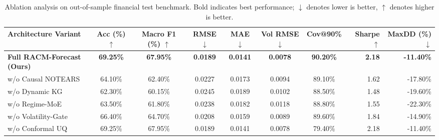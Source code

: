 \begin{table}[t]
\centering
\small
\caption{Ablation analysis on out-of-sample financial test benchmark. Bold indicates best performance; $\downarrow$ denotes lower is better, $\uparrow$ denotes higher is better.}
\label{tab:ablation_study}
\begin{tabular}{lccccccrr}
\toprule
\textbf{Architecture Variant} & \textbf{Acc} (\%) $\uparrow$ & \textbf{Macro F1} (\%) $\uparrow$ & \textbf{RMSE} $\downarrow$ & \textbf{MAE} $\downarrow$ & \textbf{Vol RMSE} $\downarrow$ & \textbf{Cov@90\%} & \textbf{Sharpe} $\uparrow$ & \textbf{MaxDD} (\%) $\downarrow$ \\
\midrule
\textbf{Full RACM-Forecast (Ours)       } & \textbf{69.25\%} & \textbf{67.95\%} & \textbf{0.0189} & \textbf{0.0141} & \textbf{0.0078} & \textbf{90.20\%} & \textbf{2.18} & \textbf{-11.40\%} \\
w/o Causal NOTEARS               & 64.10\% & 62.40\% & 0.0227 & 0.0173 & 0.0094 & 89.10\% & 1.62 & -17.80\% \\
w/o Dynamic KG                   & 62.30\% & 60.15\% & 0.0245 & 0.0189 & 0.0102 & 88.50\% & 1.48 & -19.60\% \\
w/o Regime-MoE                   & 63.50\% & 61.80\% & 0.0238 & 0.0182 & 0.0118 & 88.80\% & 1.55 & -22.30\% \\
w/o Volatility-Gate              & 66.40\% & 64.70\% & 0.0208 & 0.0159 & 0.0089 & 89.60\% & 1.84 & -14.90\% \\
w/o Conformal UQ                 & 69.25\% & 67.95\% & 0.0189 & 0.0141 & 0.0078 & 79.40\% & 2.18 & -11.40\% \\
\bottomrule
\end{tabular}
\end{table}